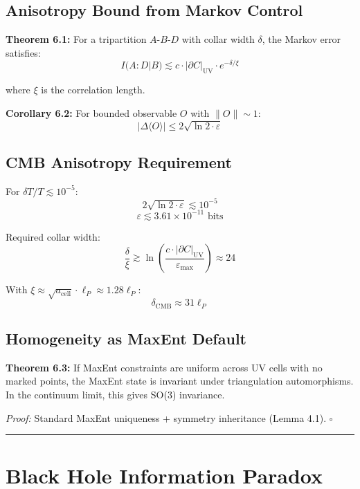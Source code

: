 \subsection{Anisotropy Bound from Markov Control}\label{61-anisotropy-bound-from-markov-control}

\textbf{Theorem 6.1:} For a tripartition \(A\)-\(B\)-\(D\) with collar width \(\delta\), the Markov error satisfies: \[I(A:D|B) \lesssim c \cdot |\partial C|_{\text{UV}} \cdot e^{-\delta/\xi}\]

where \(\xi\) is the correlation length.

\textbf{Corollary 6.2:} For bounded observable \(O\) with \(\|O\| \sim 1\): \[|\Delta\langle O \rangle| \leq 2\sqrt{\ln 2 \cdot \varepsilon}\]

\subsection{CMB Anisotropy Requirement}\label{62-cmb-anisotropy-requirement}

For \(\delta T/T \lesssim 10^{-5}\): \[2\sqrt{\ln 2 \cdot \varepsilon} \lesssim 10^{-5}\] \[\varepsilon \lesssim 3.61 \times 10^{-11} \text{ bits}\]

Required collar width: \[\frac{\delta}{\xi} \gtrsim \ln\left(\frac{c \cdot |\partial C|_{\text{UV}}}{\varepsilon_{\text{max}}}\right) \approx 24\]

With \(\xi \approx \sqrt{a_{\text{cell}}} \cdot \ell_P \approx 1.28 \ell_P\): \[\delta_{\text{CMB}} \approx 31 \ell_P\]

\subsection{Homogeneity as MaxEnt Default}\label{63-homogeneity-as-maxent-default}

\textbf{Theorem 6.3:} If MaxEnt constraints are uniform across UV cells with no marked points, the MaxEnt state is invariant under triangulation automorphisms. In the continuum limit, this gives SO(3) invariance.

\emph{Proof:} Standard MaxEnt uniqueness + symmetry inheritance (Lemma 4.1). \(\square\)

\begin{center}\rule{0.5\linewidth}{0.5pt}\end{center}

\section{Black Hole Information Paradox}\label{7-black-hole-information-paradox}

